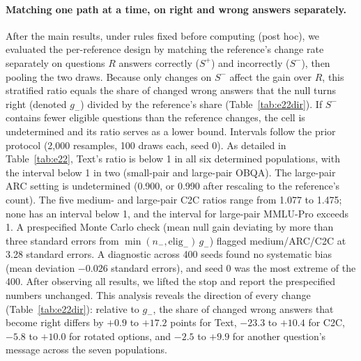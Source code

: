 \paragraph{Matching one path at a time, on right and wrong answers separately.} After the main results, under rules fixed before computing (post hoc), we evaluated the per-reference design by matching the reference's change rate separately on questions $R$ answers correctly ($S^+$) and incorrectly ($S^-$), then pooling the two draws. Because only changes on $S^-$ affect the gain over $R$, this stratified ratio equals the share of changed wrong answers that the null turns right (denoted $g_-$) divided by the reference's share (Table~\ref{tab:e22dir}). If $S^-$ contains fewer eligible questions than the reference changes, the cell is undetermined and its ratio serves as a lower bound. Intervals follow the prior protocol (2,000 resamples, 100 draws each, seed 0). As detailed in Table~\ref{tab:e22}, Text's ratio is below 1 in all six determined populations, with the interval below 1 in two (small-pair and large-pair OBQA). The large-pair ARC setting is undetermined (0.900, or 0.990 after rescaling to the reference's count). The five medium- and large-pair C2C ratios range from 1.077 to 1.475; none has an interval below 1, and the interval for large-pair MMLU-Pro exceeds 1. A prespecified Monte Carlo check (mean null gain deviating by more than three standard errors from $\min(n_-,\mathrm{elig}_-)\,g_-$) flagged medium/ARC/C2C at 3.28 standard errors. A diagnostic across 400 seeds found no systematic bias (mean deviation $-0.026$ standard errors), and seed 0 was the most extreme of the 400. After observing all results, we lifted the stop and report the prespecified numbers unchanged. This analysis reveals the direction of every change (Table~\ref{tab:e22dir}): relative to $g_-$, the share of changed wrong answers that become right differs by $+0.9$ to $+17.2$ points for Text, $-23.3$ to $+10.4$ for C2C, $-5.8$ to $+10.0$ for rotated options, and $-2.5$ to $+9.9$ for another question's message across the seven populations.

